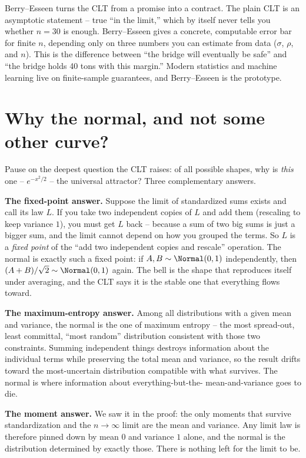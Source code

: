 \begin{aestheticbox}
Berry--Esseen turns the CLT from a promise into a contract. The plain CLT is an
asymptotic statement -- true ``in the limit,'' which by itself never tells you whether
$n = 30$ is enough. Berry--Esseen gives a concrete, computable error bar for finite $n$,
depending only on three numbers you can estimate from data ($\sigma$, $\rho$, and $n$).
This is the difference between ``the bridge will eventually be safe'' and ``the bridge
holds 40 tons with this margin.'' Modern statistics and machine learning live on
finite-sample guarantees, and Berry--Esseen is the prototype.
\end{aestheticbox}

\section{Why the normal, and not some other curve?}
\label{ch21:universality}

Pause on the deepest question the CLT raises: of all possible shapes, why
is \emph{this} one -- $e^{-x^2/2}$ -- the universal attractor? Three complementary
answers.

\textbf{The fixed-point answer.} Suppose the limit of standardized sums exists and call
its law $L$. If you take two independent copies of $L$ and add them (rescaling to keep
variance $1$), you must get $L$ back -- because a sum of two big sums is just a bigger
sum, and the limit cannot depend on how you grouped the terms. So $L$ is a
\emph{fixed point} of the ``add two independent copies and rescale'' operation. The
normal is exactly such a fixed point: if $A, B \sim \Normal(0,1)$ independently, then
$(A+B)/\sqrt 2 \sim \Normal(0,1)$ again. The bell is the shape that reproduces itself
under averaging, and the CLT says it is the stable one that everything flows toward.

\textbf{The maximum-entropy answer.} Among all distributions with a given mean and
variance, the normal is the one of maximum entropy -- the most spread-out, least
committal, ``most random'' distribution consistent with those two constraints. Summing
independent things destroys information about the individual terms while preserving the
total mean and variance, so the result drifts toward the most-uncertain distribution
compatible with what survives. The normal is where information about everything-but-the-
mean-and-variance goes to die.

\textbf{The moment answer.} We saw it in the proof: the only moments that survive
standardization and the $n \to \infty$ limit are the mean and variance. Any limit law is
therefore pinned down by mean $0$ and variance $1$ alone, and the normal is the
distribution determined by exactly those. There is nothing left for the limit to be.

